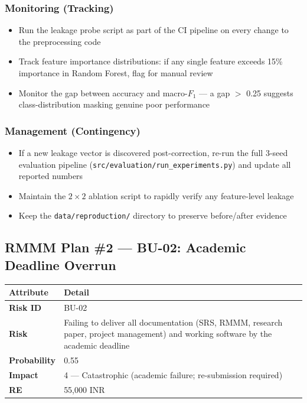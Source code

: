 \documentclass[11pt, a4paper]{article}
\newcommand{\col}[1]{\texttt{\small #1}}
\begin{document}
\subsubsection*{Monitoring (Tracking)}
\begin{itemize}[leftmargin=*]
    \item Run the leakage probe script as part of the CI pipeline on every change to the preprocessing code
    \item Track feature importance distributions: if any single feature exceeds 15\% importance in Random Forest, flag for manual review
    \item Monitor the gap between accuracy and macro-$F_1$ --- a gap $>$ 0.25 suggests class-distribution masking genuine poor performance
\end{itemize}

\subsubsection*{Management (Contingency)}
\begin{itemize}[leftmargin=*]
    \item If a new leakage vector is discovered post-correction, re-run the full 3-seed evaluation pipeline (\col{src/evaluation/run\_experiments.py}) and update all reported numbers
    \item Maintain the $2 \times 2$ ablation script to rapidly verify any feature-level leakage
    \item Keep the \col{data/reproduction/} directory to preserve before/after evidence
\end{itemize}

\subsection{RMMM Plan \#2 --- BU-02: Academic Deadline Overrun}

\begin{center}
\small
\begin{tabular}{|l|p{10cm}|}
\hline
\rowcolor{orange!10}
\textbf{Attribute} & \textbf{Detail} \\
\hline
\textbf{Risk ID} & BU-02 \\
\hline
\textbf{Risk} & Failing to deliver all documentation (SRS, RMMM, research paper, project management) and working software by the academic deadline \\
\hline
\textbf{Probability} & 0.55 \\
\hline
\textbf{Impact} & 4 --- Catastrophic (academic failure; re-submission required) \\
\hline
\textbf{RE} & 55,000 INR \\
\hline
\end{tabular}
\normalsize
\end{center}
\end{document}
